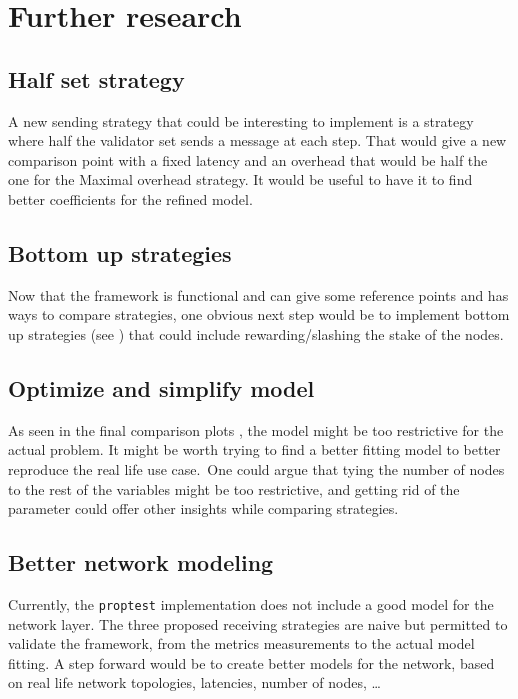 
\section{Further research}
\subsection{Half set strategy}
A new sending strategy that could be interesting to implement is a strategy
where half the validator set sends a message at each step. That would give a new
comparison point with a fixed latency and an overhead that would be half the one
for the Maximal overhead strategy. It would be useful to have it to find better
coefficients for the refined model.

\subsection{Bottom up strategies}
Now that the framework is functional and can give some reference points and has
ways to compare strategies, one obvious next step would be to implement bottom
up strategies (see ) that could include rewarding/slashing the stake of the nodes.

\subsection{Optimize and simplify model}
As seen in the final comparison plots , the model might be too restrictive for
the actual problem. It might be worth trying to find a better fitting model to
better reproduce the real life use case.\
One could argue that tying the number of nodes to the rest of the variables
might be too restrictive, and getting rid of the parameter could offer other
insights while comparing strategies.

\subsection{Better network modeling}
Currently, the \texttt{proptest} implementation does not include a good model
for the network layer. The three proposed receiving strategies are naive but
permitted to validate the framework, from the metrics measurements to the actual
model fitting. A step forward would be to create better models for the
network, based on real life network topologies, latencies, number of nodes, \ldots

